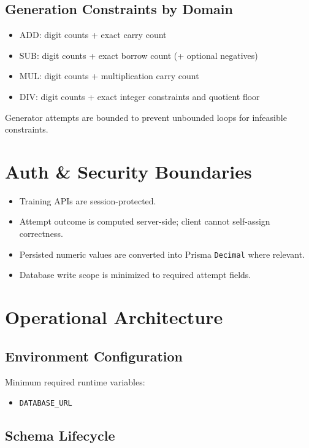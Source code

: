 \documentclass[11pt]{article}
\begin{document}
\subsection*{Generation Constraints by Domain}

\begin{itemize}[leftmargin=*]
	\item ADD: digit counts + exact carry count
	\item SUB: digit counts + exact borrow count (+ optional negatives)
	\item MUL: digit counts + multiplication carry count
	\item DIV: digit counts + exact integer constraints and quotient floor
\end{itemize}

Generator attempts are bounded to prevent unbounded loops for infeasible constraints.

\section{Auth \& Security Boundaries}

\begin{itemize}[leftmargin=*]
	\item Training APIs are session-protected.
	\item Attempt outcome is computed server-side; client cannot self-assign correctness.
	\item Persisted numeric values are converted into Prisma \texttt{Decimal} where relevant.
	\item Database write scope is minimized to required attempt fields.
\end{itemize}

\section{Operational Architecture}

\subsection*{Environment Configuration}

Minimum required runtime variables:

\begin{itemize}[leftmargin=*]
	\item \texttt{DATABASE\_URL}
\end{itemize}

\subsection*{Schema Lifecycle}
\end{document}
